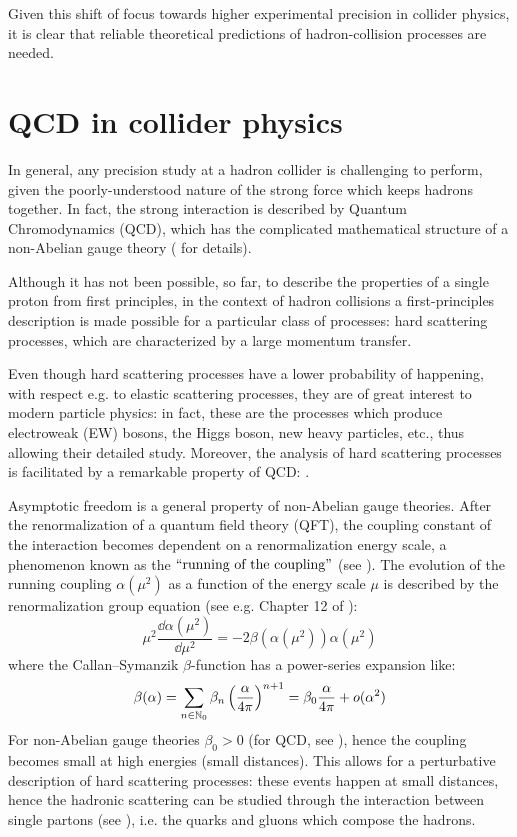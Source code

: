 Given this shift of focus towards higher experimental precision in collider physics, it is clear that reliable theoretical predictions of hadron-collision processes are needed.

\section{QCD in collider physics}

In general, any precision study at a hadron collider is challenging to perform, given the poorly-understood nature of the strong force which keeps hadrons together. In fact, the strong interaction is described by Quantum Chromodynamics (QCD), which has the complicated mathematical structure of a non-Abelian gauge theory ( for details).

Although it has not been possible, so far, to describe the properties of a single proton from first principles, in the context of hadron collisions a first-principles description is made possible for a particular class of processes: hard scattering processes, which are characterized by a large momentum transfer.

Even though hard scattering processes have a lower probability of happening, with respect e.g. to elastic scattering processes, they are of great interest to modern particle physics: in fact, these are the processes which produce electroweak (EW) bosons, the Higgs boson, new heavy particles, etc., thus allowing their detailed study. Moreover, the analysis of hard scattering processes is facilitated by a remarkable property of QCD: .

Asymptotic freedom is a general property of non-Abelian gauge theories. After the renormalization of a quantum field theory (QFT), the coupling constant of the interaction becomes dependent on a renormalization energy scale, a phenomenon known as the $ ``\text{running of the coupling}" $ (see ). The evolution of the running coupling $ \alpha(\mu^2) $ as a function of the energy scale $ \mu $ is described by the renormalization group equation (see e.g. Chapter 12 of \cite{Peskin-1995}):
\begin{equation}
  \mu^2 \frac{\dd \alpha(\mu^2)}{\dd \mu^2} = - 2 \beta(\alpha(\mu^2)) \alpha(\mu^2)
  \label{eq:ren-gr}
\end{equation}
where the Callan--Symanzik $ \beta $-function has a power-series expansion like:
\begin{equation}
  \beta(\alpha) = \sum_{n \in \mathbb{N}_0} \beta_n \left( \frac{\alpha}{4\pi} \right)^{n+1} = \beta_0 \frac{\alpha}{4\pi} + o(\alpha^2)
  \label{eq:beta-func}
\end{equation}
For non-Abelian gauge theories $ \beta_0 > 0 $ (for QCD, see \cite{Gross-1973, Politzer-1973}), hence the coupling becomes small at high energies (small distances). This allows for a perturbative description of hard scattering processes: these events happen at small distances, hence the hadronic scattering can be studied through the interaction between single partons (see ), i.e. the quarks and gluons which compose the hadrons.

